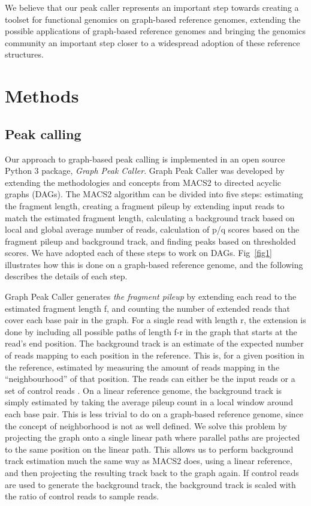 \documentclass[10pt,letterpaper]{article}
\begin{document}
We believe that our peak caller represents an important step towards creating a toolset for functional genomics on graph-based reference genomes, extending the possible applications of graph-based reference genomes and bringing the genomics community an important step closer to a widespread adoption of these reference structures.


\section*{Methods}
\subsection*{Peak calling}
Our approach to graph-based peak calling is implemented in an open source Python 3 package, \emph{Graph Peak Caller}. Graph Peak Caller was developed by extending the methodologies and concepts from MACS2 to directed acyclic graphs (DAGs). The MACS2 algorithm can be divided into five steps: estimating the fragment length, creating a fragment pileup by extending input reads to match the estimated fragment length, calculating a background track based on local and global average number of reads, calculation of p/q scores based on the fragment pileup and background track, and finding peaks based on thresholded scores. We have adopted each of these steps to work on DAGs. Fig~\ref{fig1} illustrates how this is done on a graph-based reference genome, and the following describes the details of each step.

Graph Peak Caller generates \emph{the fragment pileup} by extending each read to the estimated fragment length f, and counting the number of extended reads that cover each base pair in the graph. For a single read with length r, the extension is done by including all possible paths of length f-r in the graph that starts at the read’s end position. 
The background track is an estimate of the expected number of reads mapping to each position in the reference. This is, for a given position in the reference, estimated by measuring the amount of reads mapping in the “neighbourhood” of that position. The reads can either be the input reads or a set of control reads . On a linear reference genome, the background track is simply estimated by taking the average pileup count in a local window around each base pair. This is less trivial to do on a graph-based reference genome, since the concept of neighborhood is not as well defined. We solve this problem by projecting the graph onto a single linear path where parallel paths are projected to the same position on the linear path. This allows us to perform background track estimation much the same way as MACS2 does, using a linear reference, and then projecting the resulting track back to the graph again. If control reads are used to generate the background track, the background track is scaled with the ratio of control reads to sample reads.
	
\end{document}
